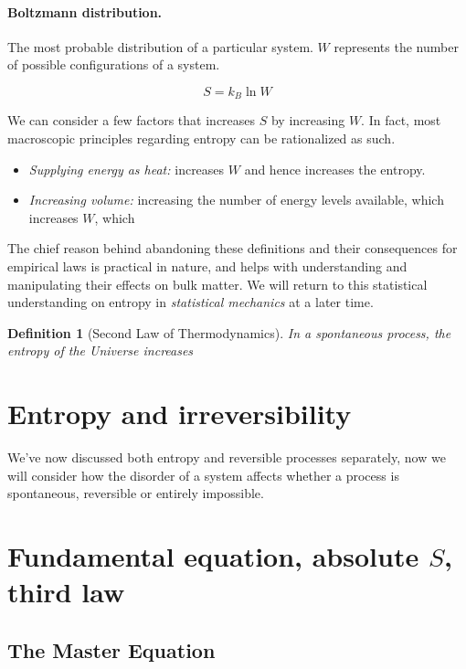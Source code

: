 \documentclass{article}
\numberwithin{theorem}{section}
\numberwithin{corollary}{section}
\numberwithin{postulate}{section}
\numberwithin{lemma}{section}
\newtheorem{definition}{Definition}
\numberwithin{definition}{section}
\begin{document}
\paragraph{Boltzmann distribution. } The most probable distribution of a
particular system. $W$ represents the number of possible configurations of a
system.

\begin{equation}
  S = k_{B} \ln{W}
\end{equation}

We can consider a few factors that increases $S$ by increasing $W$. In fact, most
macroscopic principles regarding entropy can be rationalized as such.

\begin{itemize}
  \item \textit{Supplying energy as heat:} increases $W$ and hence increases the
    entropy.
  \item \textit{Increasing volume:} increasing the number of energy levels
    available, which increases $W$, which
\end{itemize}

The chief reason behind abandoning these definitions and their consequences for
empirical laws is practical in nature, and helps with understanding and
manipulating their effects on bulk matter. We will return to this statistical
understanding on entropy in \textit{statistical mechanics} at a later time.

\begin{definition}[Second Law of Thermodynamics]
  In a spontaneous process, the entropy of the Universe increases
\end{definition}

\section{Entropy and irreversibility}

We've now discussed both entropy and reversible processes separately, now we
will consider how the disorder of a system affects whether a process is
spontaneous, reversible or entirely impossible.

\section{Fundamental equation, absolute $S$, third law}

\subsection{The Master Equation}
\end{document}
